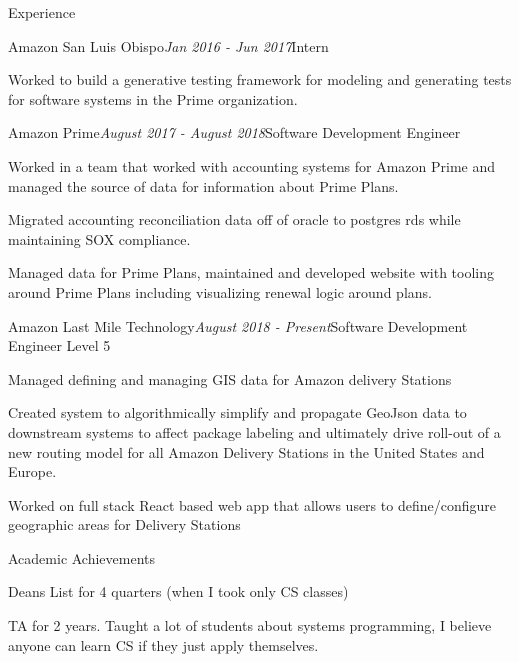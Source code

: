 \documentclass{resume} %
\begin{document}
\begin{rSection}{Experience}

\begin{rSubsection}{Amazon San Luis Obispo}{\em Jan 2016 - Jun 2017}{Intern}{}
\item Worked to build a generative testing framework for modeling and generating tests for software systems in the Prime organization. 
\end{rSubsection}


\begin{rSubsection}{Amazon Prime}{\em August 2017 - August 2018}{Software Development Engineer}{}
\item Worked in a team that worked with accounting systems for Amazon Prime and managed the source of data for information about Prime Plans.
\item Migrated accounting reconciliation data off of oracle to postgres rds while maintaining SOX compliance.
\item Managed data for Prime Plans, maintained and developed website with tooling around Prime Plans including visualizing renewal logic around plans. 
\end{rSubsection}


\begin{rSubsection}{Amazon Last Mile Technology}{\em August 2018 - Present}{Software Development Engineer Level 5}{}
\item Managed defining and managing GIS data for Amazon delivery Stations
\item Created system to algorithmically simplify and propagate GeoJson data to downstream systems to affect package labeling and ultimately drive roll-out of a new routing model for all Amazon Delivery Stations in the United States and Europe.
\item Worked on full stack React based web app that allows users to define/configure geographic areas for Delivery Stations
\end{rSubsection}
\end{rSection}


\begin{rSection}{Academic Achievements} \itemsep -2pt
\item Deans List for 4 quarters (when I took only CS classes)
\item TA for 2 years. Taught a lot of students about systems programming, I believe anyone can learn CS if they just apply themselves.
\item 
\end{rSection}
\end{document}
